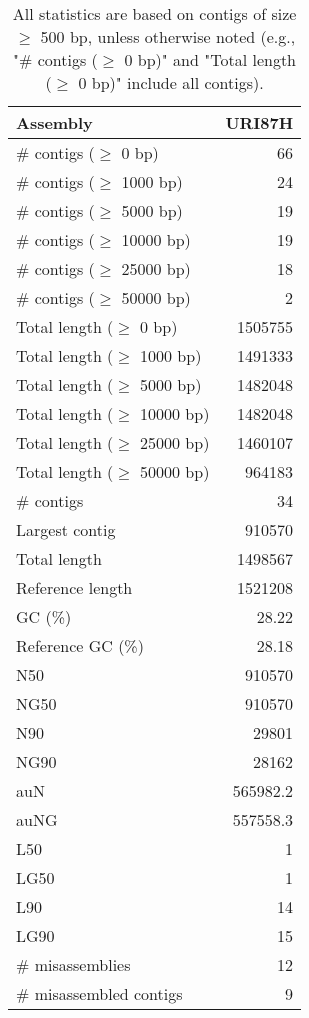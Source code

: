 \documentclass[12pt,a4paper]{article}
\begin{document}
\begin{table}[ht]
\begin{center}
\caption{All statistics are based on contigs of size $\geq$ 500 bp, unless otherwise noted (e.g., "\# contigs ($\geq$ 0 bp)" and "Total length ($\geq$ 0 bp)" include all contigs).}
\begin{tabular}{|l*{1}{|r}|}
\hline
Assembly & URI87H \\ \hline
\# contigs ($\geq$ 0 bp) & 66 \\ \hline
\# contigs ($\geq$ 1000 bp) & 24 \\ \hline
\# contigs ($\geq$ 5000 bp) & 19 \\ \hline
\# contigs ($\geq$ 10000 bp) & 19 \\ \hline
\# contigs ($\geq$ 25000 bp) & 18 \\ \hline
\# contigs ($\geq$ 50000 bp) & 2 \\ \hline
Total length ($\geq$ 0 bp) & 1505755 \\ \hline
Total length ($\geq$ 1000 bp) & 1491333 \\ \hline
Total length ($\geq$ 5000 bp) & 1482048 \\ \hline
Total length ($\geq$ 10000 bp) & 1482048 \\ \hline
Total length ($\geq$ 25000 bp) & 1460107 \\ \hline
Total length ($\geq$ 50000 bp) & 964183 \\ \hline
\# contigs & 34 \\ \hline
Largest contig & 910570 \\ \hline
Total length & 1498567 \\ \hline
Reference length & 1521208 \\ \hline
GC (\%) & 28.22 \\ \hline
Reference GC (\%) & 28.18 \\ \hline
N50 & 910570 \\ \hline
NG50 & 910570 \\ \hline
N90 & 29801 \\ \hline
NG90 & 28162 \\ \hline
auN & 565982.2 \\ \hline
auNG & 557558.3 \\ \hline
L50 & 1 \\ \hline
LG50 & 1 \\ \hline
L90 & 14 \\ \hline
LG90 & 15 \\ \hline
\# misassemblies & 12 \\ \hline
\# misassembled contigs & 9 \\ \hline

\end{tabular}
\end{center}
\end{table}
\end{document}
